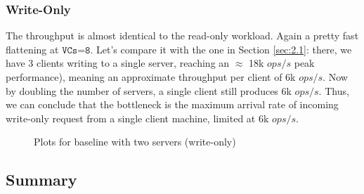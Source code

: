 \documentclass[11pt,a4paper]{article}
\newcommand{\num}[1]{\texttt{#1}}
\begin{document}
\subsubsection*{Write-Only}

The throughput is almost identical to the read-only workload. Again a pretty fast flattening at $\num{VCs=8}$. 
Let's compare it with the one in Section \ref{sec:2.1}: there, we have 3 clients writing to a single server, reaching an $\approx$ 18k $ops/s$ peak performance), meaning an approximate throughput per client of 6k $ops/s$.
Now by doubling the number of servers, a single client still produces 6k $ops/s$. 
Thus, we can conclude that the bottleneck is the maximum arrival rate of incoming write-only request from a single client machine, limited at 6k $ops/s$. 

\newpage

\begin{figure}[!h]
  \centering
  \caption{Plots for baseline with two servers (write-only)}
  \label{fig:baseline_no_mw_2_server_wo}
\end{figure}

\subsection{Summary}
\end{document}
